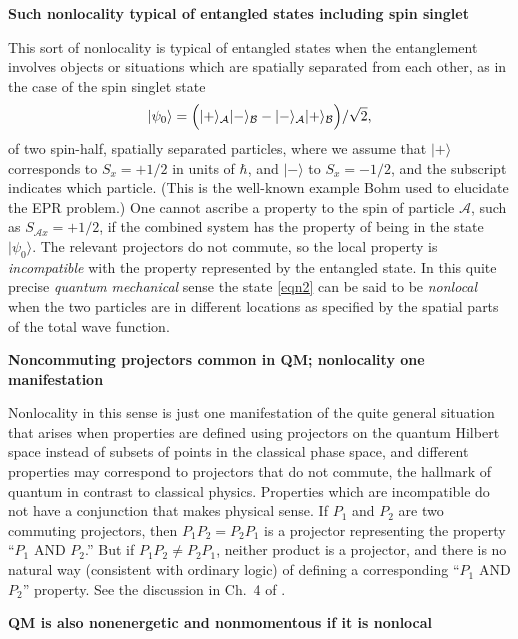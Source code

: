 \documentclass[10pt]{article} %
\def\outl#1{\par{\medskip\noindent\hspace*{.5cm}\bf
      \mathversion{bold}#1\mathversion{normal}\smallskip} }
\def\np{} \def\xa{} \def\xb{} \def\xn{} \def\xp{}
\def\outl#1{} \def\np{} \def\xa{} \def\xb{} \def\xn{} \def\xp{}
\def\outl#1{\par{\medskip\noindent\hspace*{.5cm}\bf
      \mathversion{bold}#1\mathversion{normal}\smallskip} }
\def\np{\newpage }\def\xn{\nopagebreak }\def\xp{\pagebreak }
\newcommand{\Blp}{\Bigl(}
\newcommand{\Brp}{\Bigr)}
\newcommand{\ket}[1]{|#1\rgl }
\newcommand{\rgl}{\rangle }
\newcommand{\st}{\sqrt{2}}
\newcommand{\AM}{{\mathcal A}}
\newcommand{\BM}{{\mathcal B}}
\begin{document}
\xb
\outl{Such nonlocality typical of entangled states including spin singlet}
\xa


This sort of nonlocality is typical of entangled states when the entanglement
involves objects or situations which are spatially separated from each other,
as in the case of the spin singlet state
\begin{equation}
  \ket{\psi_0} = \Blp\ket{+}_\AM\ket{-}_\BM - \ket{-}_\AM\ket{+}_\BM\Brp/\st,
\label{eqn2}
\end{equation}
of two spin-half, spatially separated particles, where we assume that
$\ket{+}$ corresponds to $S_x=+1/2$ in units of $\hbar$, and $\ket{-}$ to
$S_x=-1/2$, and the subscript indicates which particle.  (This is the
well-known example Bohm \cite{Bhm51s} used to elucidate the EPR problem.)  One
cannot ascribe a property to the spin of particle $\AM$, such as $S_{\AM
  x}=+1/2$, if the combined system has the property of being in the state
$\ket{\psi_0}$.  The relevant projectors do not commute, so the local property
is \emph{incompatible} with the property represented by the entangled state.
In this quite precise \emph{quantum mechanical} sense the state \eqref{eqn2}
can be said to be \emph{nonlocal} when the two particles are in different
locations as specified by the spatial parts of the total wave function.

\xb
\outl{Noncommuting projectors common in QM; nonlocality one manifestation}
\xa



Nonlocality in this sense is just one manifestation of the quite general
situation that arises when properties are defined using projectors on the
quantum Hilbert space instead of subsets of points in the classical phase
space, and different properties may correspond to projectors that do not
commute, the hallmark of quantum in contrast to classical physics.  Properties
which are incompatible do not have a conjunction that makes physical sense.
If $P_1$ and $P_2$ are two commuting projectors, then $P_1 P_2 = P_2 P_1$ is a
projector representing the property ``$P_1$ AND $P_2$.''  But if $P_1 P_2 \neq
P_2 P_1$, neither product is a projector, and there is no natural way
(consistent with ordinary logic) of defining a corresponding ``$P_1$ AND
$P_2$'' property.  See the discussion in Ch.~4 of \cite{Grff02c}.

\xb
\outl{QM is also nonenergetic and nonmomentous if it is nonlocal }
\xa
 
\end{document}
